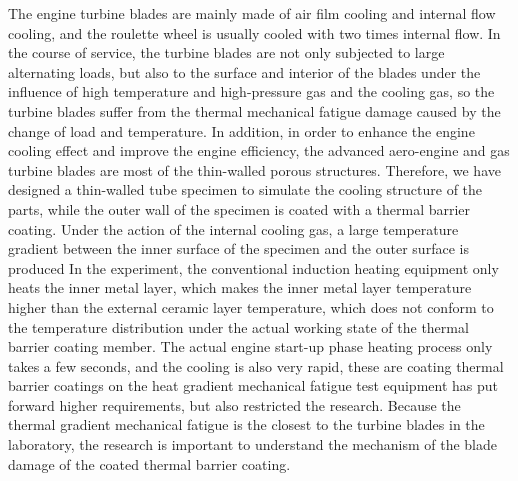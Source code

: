 The engine turbine blades are mainly made of air film cooling and internal flow cooling, and the roulette wheel is usually cooled with two times internal flow.
In the course of service, the turbine blades are not only subjected to large alternating loads, but also to the surface and interior of the blades under the influence of high temperature and high-pressure gas and the cooling gas, so the turbine blades suffer from the thermal mechanical fatigue damage caused by the change of load and temperature.
In addition, in order to enhance the engine cooling effect and improve the engine efficiency, the advanced aero-engine and gas turbine blades are most of the thin-walled porous structures.
Therefore, we have designed a thin-walled tube specimen to simulate the cooling structure of the parts, while the outer wall of the specimen is coated with a thermal barrier coating.
Under the action of the internal cooling gas, a large temperature gradient between the inner surface of the specimen and the outer surface is produced
In the experiment, the conventional induction heating equipment only heats the inner metal layer, which makes the inner metal layer temperature higher than the external ceramic layer temperature, which does not conform to the temperature distribution under the actual working state of the thermal barrier coating member.
The actual engine start-up phase heating process only takes a few seconds, and the cooling is also very rapid, these are coating thermal barrier coatings on the heat gradient mechanical fatigue test equipment has put forward higher requirements, but also restricted the research.
Because the thermal gradient mechanical fatigue is the closest to the turbine blades in the laboratory, the research is important to understand the mechanism of the blade damage of the coated thermal barrier coating.

